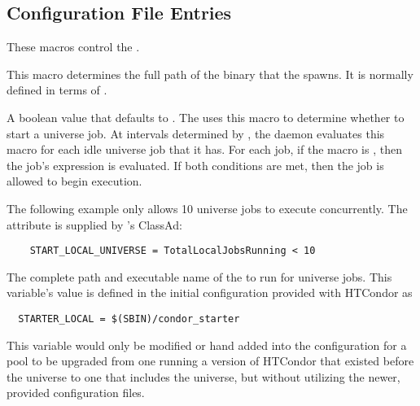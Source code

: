 \subsection{\label{sec:Schedd-Config-File-Entries}
Configuration File Entries}

These macros control the .
\begin{description}

\label{param:Shadow}
\item[\Macro{SHADOW}]
  This macro determines the
  full path of the  binary that the 
  spawns.  It is normally defined in terms of . 
  
\label{param:StartLocalUniverse}
\item[\Macro{START\_LOCAL\_UNIVERSE}]
  A boolean value that defaults to .
  The  uses this macro to determine whether to start
  a  universe job. 
  At intervals determined by , 
  the  daemon evaluates this macro
  for each idle  universe job that it has.
  For each job, if the  
  macro is , then the job's  expression
  is evaluated. If both conditions are met, then the job is allowed
  to begin execution. 
  
  The following example only allows 10  universe jobs to
  execute concurrently. The attribute 
  is supplied by 's ClassAd:
  
  \footnotesize
  \begin{verbatim}
    START_LOCAL_UNIVERSE = TotalLocalJobsRunning < 10
  \end{verbatim}
  \normalsize
  
\label{param:StarterLocal}
\item[\Macro{STARTER\_LOCAL}]
  The complete path and executable name of the  to
  run for  universe jobs.  This variable's value
  is defined in the initial configuration provided with HTCondor as
  \footnotesize
  \begin{verbatim}
  STARTER_LOCAL = $(SBIN)/condor_starter
  \end{verbatim}
  \normalsize
  This variable would only be modified or hand added into 
  the configuration for a pool to be upgraded from one
  running a version of HTCondor that existed before the
   universe to one that includes the
   universe, but without utilizing the newer, provided
  configuration files.


\end{description}
